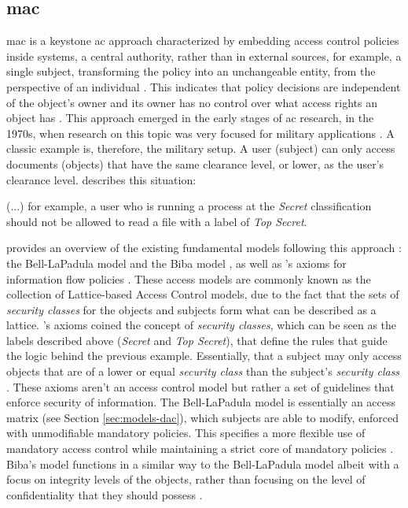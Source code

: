 \subsection{\glsdesc{mac}}
\label{sec:models-mac}

\glsdesc{mac} is a keystone \gls{ac} approach characterized by embedding access control policies inside systems, a central authority, rather than in external sources, for example, a single subject, transforming the policy into an unchangeable entity, from the perspective of an individual \cite[23]{biba_integrity_1977}.  This indicates that policy decisions are independent of the object's owner and its owner has no control over what access rights an object has \cite[7]{hu_assessment_2006}. This approach emerged in the early stages of \gls{ac} research, in the 1970s, when research on this topic was very focused for military applications \cite{sandhu_lattice-based_1993}. A classic example is, therefore, the military setup. A user (subject) can only access documents (objects) that have the same clearance level, or lower, as the user's clearance level. \cite{hu_assessment_2006} describes this situation:

\begin{displayquote}
	(...) for example, a user who is running a process at the \textit{Secret} classification should not be allowed to read a file with a label of \textit{Top Secret}. \cite[7]{hu_assessment_2006}
\end{displayquote}

\citeauthor{sandhu_lattice-based_1993} \cite{sandhu_lattice-based_1993} provides an overview of the existing fundamental models following this approach \cite{sandhu_lattice-based_1993}: the Bell-LaPadula model \cite{bell_secure_1973} and the Biba model \cite{biba_integrity_1977}, as well as \citeauthor{denning_lattice_1976}'s axioms for information flow policies \cite{denning_lattice_1976}. These access models are commonly known as the collection of Lattice-based Access Control models, due to the fact that the sets of \textit{security classes} for the objects and subjects form what can be described as a lattice. \citeauthor{denning_lattice_1976}'s axioms coined the concept of \textit{security classes}, which can be seen as the labels described above (\emph{Secret} and \emph{Top Secret}), that define the rules that guide the logic behind the previous example. Essentially, that a subject may only access objects that are of a lower or equal \textit{security class} than the subject's \emph{security class} \cite[1-4]{sandhu_lattice-based_1993}. These axioms aren't an access control model but rather a set of guidelines that enforce security of information. The Bell-LaPadula model is essentially an access matrix (see Section \ref{sec:models-dac}), which subjects are able to modify, enforced with unmodifiable mandatory policies. This specifies a more flexible use of mandatory access control while maintaining a strict core of mandatory policies \cite[9-11]{sandhu_lattice-based_1993}. Biba's model functions in a similar way to the Bell-LaPadula model albeit with a focus on integrity levels of the objects, rather than focusing on the level of confidentiality that they should possess \cite[11-13]{sandhu_lattice-based_1993}.

